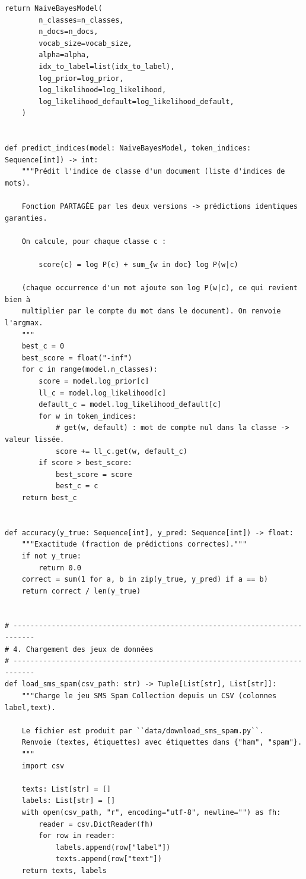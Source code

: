 \begin{lstlisting}[style=py]
    return NaiveBayesModel(
        n_classes=n_classes,
        n_docs=n_docs,
        vocab_size=vocab_size,
        alpha=alpha,
        idx_to_label=list(idx_to_label),
        log_prior=log_prior,
        log_likelihood=log_likelihood,
        log_likelihood_default=log_likelihood_default,
    )


def predict_indices(model: NaiveBayesModel, token_indices: Sequence[int]) -> int:
    """Prédit l'indice de classe d'un document (liste d'indices de mots).

    Fonction PARTAGÉE par les deux versions -> prédictions identiques garanties.

    On calcule, pour chaque classe c :

        score(c) = log P(c) + sum_{w in doc} log P(w|c)

    (chaque occurrence d'un mot ajoute son log P(w|c), ce qui revient bien à
    multiplier par le compte du mot dans le document). On renvoie l'argmax.
    """
    best_c = 0
    best_score = float("-inf")
    for c in range(model.n_classes):
        score = model.log_prior[c]
        ll_c = model.log_likelihood[c]
        default_c = model.log_likelihood_default[c]
        for w in token_indices:
            # get(w, default) : mot de compte nul dans la classe -> valeur lissée.
            score += ll_c.get(w, default_c)
        if score > best_score:
            best_score = score
            best_c = c
    return best_c


def accuracy(y_true: Sequence[int], y_pred: Sequence[int]) -> float:
    """Exactitude (fraction de prédictions correctes)."""
    if not y_true:
        return 0.0
    correct = sum(1 for a, b in zip(y_true, y_pred) if a == b)
    return correct / len(y_true)


# ---------------------------------------------------------------------------
# 4. Chargement des jeux de données
# ---------------------------------------------------------------------------
def load_sms_spam(csv_path: str) -> Tuple[List[str], List[str]]:
    """Charge le jeu SMS Spam Collection depuis un CSV (colonnes label,text).

    Le fichier est produit par ``data/download_sms_spam.py``.
    Renvoie (textes, étiquettes) avec étiquettes dans {"ham", "spam"}.
    """
    import csv

    texts: List[str] = []
    labels: List[str] = []
    with open(csv_path, "r", encoding="utf-8", newline="") as fh:
        reader = csv.DictReader(fh)
        for row in reader:
            labels.append(row["label"])
            texts.append(row["text"])
    return texts, labels



\end{lstlisting}
